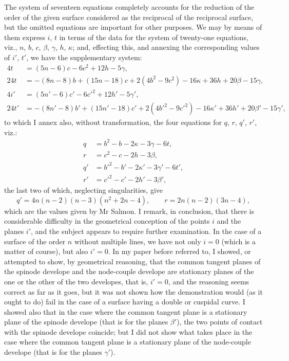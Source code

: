 \documentclass[11pt,a4paper]{book}
\theoremstyle{plain}
\begin{document}
The system of seventeen equations completely accounts for the reduction of the order of the given surface considered as the reciprocal of the reciprocal surface, but the omitted equations are important for other purposes. We may by means of them express $i$, $t$ in terms of the data for the system of twenty-one equations, viz., $n$, $b$, $c$, $\beta$, $\gamma$, $h$, $\kappa$; and, effecting this, and annexing the corresponding values of $i'$, $t'$, we have the supplementary system:
\begin{align*}
4t &= (5n-6)c-6c^2+12h-5\gamma,\\
24t &= -(8n-8)b+(15n-18)c+2(4b^2-9c^2)-16\kappa+36h+20\beta-15\gamma,\\
4i' &= (5n'-6)c'-6c'^2+12h'-5\gamma',\\
24t' &= -(8n'-8)b'+(15n'-18)c'+2(4b'^2-9c'^2)-16\kappa'+36h'+20\beta'-15\gamma',
\end{align*}
to which I annex also, without transformation, the four equations for $q$, $r$, $q'$, $r'$, viz.:
\begin{align*}
q &= b^2-b-2\kappa-3\gamma-6t,\\
r &= c^2-c-2h-3\beta,\\
q' &= b'^2-b'-2\kappa'-3\gamma'-6t',\\
r' &= c'^2-c'-2h'-3\beta',
\end{align*}
the last two of which, neglecting singularities, give
\[
q'=4n(n-2)(n-3)(n^2+2n-4),\qquad r=2n(n-2)(3n-4),
\]
which are the values given by Mr Salmon. I remark, in conclusion, that there is considerable difficulty in the geometrical conception of the points $i$ and the planes $i'$, and the subject appears to require further examination. In the case of a surface of the order $n$ without multiple lines, we have not only $i=0$ (which is a matter of course), but also $i'=0$. In my paper before referred to, I showed, or attempted to show, by geometrical reasoning, that the common tangent planes of the spinode develope and the node-couple develope are stationary planes of the one or the other of the two developes, that is, $i'=0$, and the reasoning seems correct as far as it goes, but it was not shown how the demonstration would (as it ought to do) fail in the case of a surface having a double or cuspidal curve. I showed also that in the case where the common tangent plane is a stationary plane of the spinode develope (that is for the planes $\beta'$), the two points of contact with the spinode develope coincide; but I did not show what takes place in the case where the common tangent plane is a stationary plane of the node-couple develope (that is for the planes $\gamma'$).
\newpage
\end{document}
